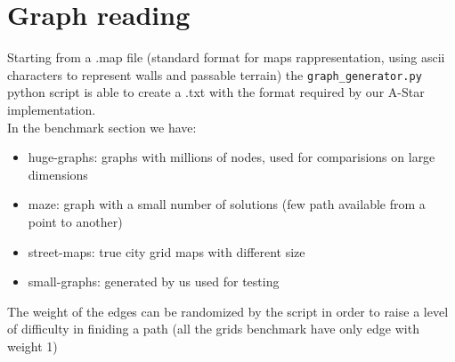 \section{Graph reading}
\label{Sec:reading}

Starting from a .map file (standard format for maps rappresentation, using ascii characters to represent walls and passable terrain)
the \verb|graph_generator.py| python script is able to create a .txt with the format required by our A-Star implementation. \\
In the benchmark section we have:
\begin{itemize}
	\item huge-graphs: graphs with millions of nodes, used for comparisions on large dimensions
	\item maze: graph with a small number of solutions (few path available from a point to another)
	\item street-maps: true city grid maps with different size
	\item small-graphs: generated by us used for testing
\end{itemize}

The weight of the edges can be randomized by the script in order to raise a level of difficulty in finiding a path (all the grids benchmark have only edge with weight 1)
